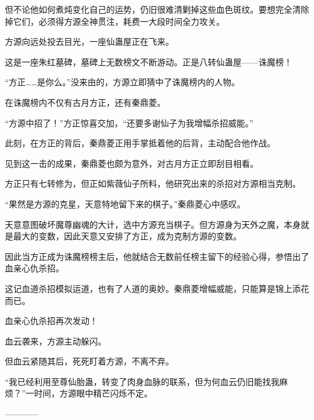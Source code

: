 \begin{this_body}
但不论他如何煮炖变化自己的运势，仍旧很难清剿掉这些血色斑纹。要想完全清除掉它们，必须得方源全神贯注，耗费一大段时间全力攻关。

方源向远处投去目光，一座仙蛊屋正在飞来。

这是一座朱红墓碑，墓碑上无数榜文不断游动。正是八转仙蛊屋——诛魔榜！

“方正……是你么。”没来由的，方源立即猜中了诛魔榜内的人物。

在诛魔榜内不仅有古月方正，还有秦鼎菱。

“方源中招了！”方正惊喜交加，“还要多谢仙子为我增幅杀招威能。”

此刻，在方正的背后，秦鼎菱正用手掌抵着他的后背，主动配合他作战。

见到这一击的成果，秦鼎菱也颇为意外，对古月方正立即刮目相看。

方正只有七转修为，但正如紫薇仙子所料，他研究出来的杀招对方源相当克制。

“果然是方源的克星，天意特地留下来的棋子。”秦鼎菱心中感叹。

天意意图破坏魔尊幽魂的大计，选中方源充当棋子。但方源身为天外之魔，本身就是最大的变数，因此天意又安排了方正，成为克制方源的变数。

因此当方正成为诛魔榜榜主后，他就结合无数前任榜主留下的经验心得，参悟出了血亲心仇杀招。

这记血道杀招模拟运道，也有了人道的奥妙。秦鼎菱增幅威能，只能算是锦上添花而已。

血亲心仇杀招再次发动！

血云袭来，方源主动躲闪。

但血云紧随其后，死死盯着方源，不离不弃。

“我已经利用至尊仙胎蛊，转变了肉身血脉的联系，但为何血云仍旧能找我麻烦？”一时间，方源眼中精芒闪烁不定。

------------

\end{this_body}

